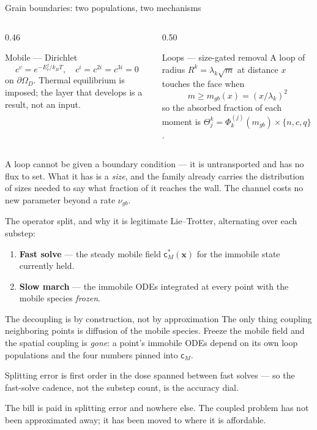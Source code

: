 \documentclass[aspectratio=169,10pt]{beamer}
\newcommand{\spvec}[1]{\bm{\mathsf{#1}}}
\newcommand{\xv}{\bm{x}}
\newcommand{\foot}[1]{\par\vspace{1ex}%
  \begingroup\footnotesize\raggedright #1\par\endgroup}
\begin{document}
\begin{frame}{Grain boundaries: two populations, two mechanisms}
\begin{columns}[T]
\begin{column}{0.46\textwidth}
\begin{block}{Mobile --- Dirichlet}\small
\[c^{v}=e^{-E^{f}_v/k_BT},\quad c^{i}=c^{2i}=c^{3i}=0\]
on $\partial\Omega_D$. Thermal equilibrium is imposed; the layer that develops
is a result, not an input.
\end{block}
\end{column}
\begin{column}{0.50\textwidth}
\begin{block}{Loops --- size-gated removal}\small
A loop of radius $R^k=\lambda_k\sqrt m$ at distance $x$ touches the face when
\[m\ge m_{gb}(x)=(x/\lambda_k)^{2}\]
so the absorbed fraction of each moment is
$\Theta^k_j=\Phi^{(j)}_k(m_{gb})\times\{n,c,q\}$.
\end{block}
\end{column}
\end{columns}
\vspace{1ex}
\foot{A loop cannot be given a boundary condition --- it is untransported and
has no flux to set. What it has is a \emph{size}, and the family already
carries the distribution of sizes needed to say what fraction of it reaches the
wall. The channel costs no new parameter beyond a rate $\nu_{gb}$.}
\end{frame}

\begin{frame}{The operator split, and why it is legitimate}
\small
Lie--Trotter, alternating over each substep:
\begin{enumerate}\small
  \item \textbf{Fast solve} --- the steady mobile field
        $\spvec c_M^{*}(\xv)$ for the immobile state currently held.
  \item \textbf{Slow march} --- the immobile ODEs integrated at every point
        with the mobile species \emph{frozen}.
\end{enumerate}
\begin{block}{The decoupling is by construction, not by approximation}
The only thing coupling neighboring points is diffusion of the mobile species.
Freeze the mobile field and the spatial coupling is \emph{gone}: a point's
immobile ODEs depend on its own loop populations and the four numbers pinned
into $\spvec c_M$.
\end{block}
\vspace{0.5ex}
Splitting error is first order in the dose spanned between fast solves --- so
the fast-solve cadence, not the substep count, is the accuracy dial.
\foot{The bill is paid in splitting error and nowhere else. The coupled problem
has not been approximated away; it has been moved to where it is affordable.}
\end{frame}
\end{document}
